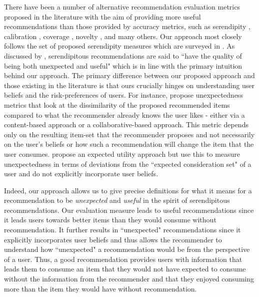 \documentclass[format=acmsmall, review=false]{acmart}
\begin{document}
\par 
There have been a number of alternative recommendation evaluation metrics proposed in the literature with the aim of providing more useful recommendations than those provided by accuracy metrics, such as serendipity \cite{kotkov2016survey}, calibration \cite{steck2018calibrated}, coverage \cite{ge2010beyond}, novelty \cite{vargas2011rank}, and many others. Our approach most closely follows the set of proposed serendipity measures which are surveyed in \cite{kotkov2016survey}. As discussed by \cite{maksai2015predicting},  serendipitous recommendations are said to ``have the quality of being both unexpected and useful" which is in line with the primary intuition behind our approach. The primary difference between our proposed approach and those existing in the literature is that ours crucially hinges on understanding user beliefs and the risk-preferences of users. For instance, \cite{vargas2011rank, kaminskas2014measuring} propose unexpectedness metrics that look at the dissimilarity of the proposed recommended items compared to what the recommender already knows the user likes - either via a content-based approach or a collaborative-based approach. This metric depends only on the resulting item-set that the recommender proposes and not necessarily on the user's beliefs or how such a recommendation will change the item that the user consumes. \cite{adamopoulos2015unexpectedness} propose an expected utility approach but use this to measure unexpectedness in terms of deviations from the ``expected consideration set" of a user and do not explicitly incorporate user beliefs.
\par 
Indeed, our approach allows us to give precise definitions for what it means for a recommendation to be \textit{unexpected} and \textit{useful} in the spirit of serendipitous recommendations. Our evaluation measure leads to useful recommendations since it leads users towards better items than they would consume without recommendation. It further results in 	``unexpected" recommendations since it explicitly incorporates user beliefs and thus allows the recommender to understand how ``unexpected" a recommendation would be from the perspective of a user. Thus, a good recommendation provides users with information that leads them to consume an item that they would not have expected to consume without the information from the recommender and that they enjoyed consuming more than the item they would have without recommendation.


\end{document}

